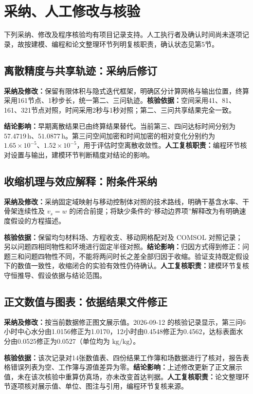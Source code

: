 \documentclass[withoutpreface,bwprint]{commons/cumcmthesis}
\newcommand{\field}[1]{\mbox{\textbf{#1：}}}
\begin{document}
\section{采纳、人工修改与核验}
下列采纳、修改及程序核验均有项目记录支持。人工执行者及确认时间尚未逐项记录，故按建模、编程和论文整理环节列明复核职责，确认状态见第5节。

\subsection{离散精度与共享轨迹：采纳后修订}
\field{采纳及修改}保留有限体积与隐式迭代框架，明确区分计算网格与输出位置，终算采用161节点、1秒步长，统一第二、三问轨迹。\field{核验依据}空间采用41、81、161、321节点对照，时间采用2秒与1秒对照；第二、三问共享结果完全一致。

\field{结论影响}早期离散结果已由终算结果替代。当前第三、四问达标时间分别为 $57.4719\,\mathrm h$、$51.0877\,\mathrm h$。第三问空间加密和时间加密的相对变化分别约为 $1.65\times10^{-5}$、$1.52\times10^{-5}$，用于评估时空离散收敛性。\field{人工复核职责}编程环节核对设置与输出，建模环节判断精度对结论的影响。

\subsection{收缩机理与效应解释：附条件采纳}
\field{采纳及修改}采纳固定域映射与移动控制体对照的技术路线，明确干基含水率、干骨架连续性及 $v_s=w$ 的闭合前提；将缺少条件的“移动边界项”解释改为有明确速度假设的方程描述。

\field{核验依据}保留均匀材料场、方程收支、移动网格配对及 COMSOL 对照记录；另以问题四相同物性和环境进行固定半径对照。\field{结论影响}归因方式得到修正：问题三和问题四物性不同，不能将两问时长之差全部归因于收缩。验证支持既定假设下的数值一致性，收缩闭合的实验有效性仍待确认。\field{人工复核职责}建模环节复核守恒推导、假设依据与结论范围。

\subsection{正文数值与图表：依据结果文件修正}
\field{采纳及修改}按当前数据修正图文展示值。2026-09-12 的核验记录显示，第三问6小时中心水分由1.0156修正为1.0170，12小时由0.4548修正为0.4562，达标表面水分由0.0525修正为0.0527（单位均为 $\mathrm{kg/kg}$）。

\field{核验依据}该次记录对14张数值表、四份结果工作簿和场数据进行了核对，报告表格错误列表为空、工作簿与源值差异为零。\field{结论影响}上述修改更新了正文展示值，未在该次核验中重算仿真场，亦未改变首达判据。\field{人工复核职责}论文整理环节逐项核对展示值、单位、图注与引用，编程环节复核来源。
\end{document}

